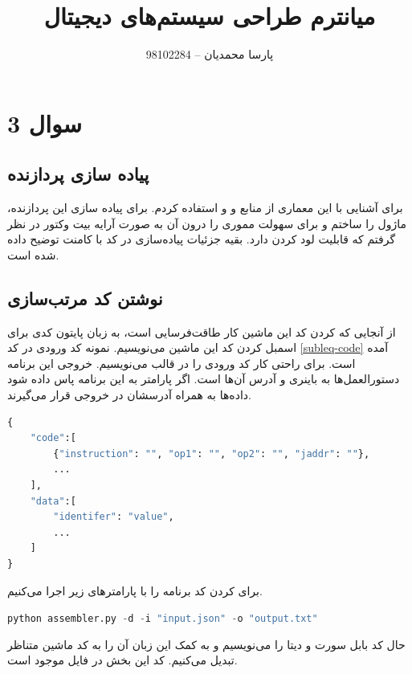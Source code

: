 \documentclass{article}
\title{میانترم طراحی سیستم‌های دیجیتال}
\author{پارسا محمدیان -- 98102284}
\begin{document}
\maketitle
\newpage
\tableofcontents
\newpage

\section{سوال 3}

\subsection{پیاده سازی پردازنده }
برای آشنایی با این معماری از منابع 
\cite{oisc-wikipedia} 
و 
\cite{subleq-esolangs} 
و 
\cite{subleq-game} 
استفاده کردم. 
برای پیاده سازی این پردازنده، ماژول 
را ساختم و برای سهولت مموری را درون آن به صورت آرایه بیت وکتور در نظر گرفتم که قابلیت لود کردن دارد. 
بقیه جزئیات پیاده‌سازی در کد با کامنت توضیح داده شده است.

\subsection{نوشتن کد مرتب‌سازی}
از آنجایی که 
کردن کد این ماشین کار طاقت‌فرسایی است، به زبان پایتون کدی برای اسمبل کردن 
کد این ماشین می‌نویسیم. نمونه کد ورودی 
در کد 
\ref{subleq-code}
آمده است. برای راحتی کار کد ورودی را در قالب 
می‌نویسیم. خروجی این برنامه دستورالعمل‌ها به باینری و آدرس آن‌ها است. اگر پارامتر 
به این برنامه پاس داده شود داده‌ها به همراه آدرسشان در خروجی قرار می‌گیرند. 

\begin{latin}  
\begin{lstlisting}[language=python, caption={Subleq assembler input code}, label={subleq-code}]
{
    "code":[
        {"instruction": "", "op1": "", "op2": "", "jaddr": ""},
        ...
    ],
    "data":[
        "identifer": "value",
        ...
    ]
}
\end{lstlisting}
\end{latin}

برای 
کردن کد برنامه را با پارامترهای زیر اجرا می‌کنیم.

\begin{latin}
	\lstinline[language=python]{python assembler.py -d -i "input.json" -o "output.txt"}
\end{latin}

حال کد بابل سورت و دیتا را می‌نویسیم و به کمک این زبان آن را به کد ماشین متناظر تبدیل می‌کنیم. کد این بخش در فایل 
موجود است.
\end{document}
